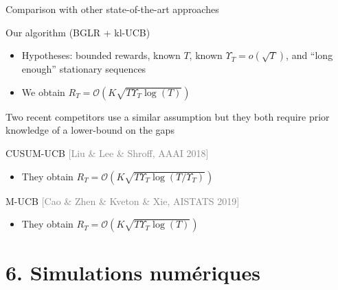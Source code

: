 \documentclass[11pt,french,ignorenonframetext,]{beamer}
\begin{document}
\begin{frame}{Comparison with other state-of-the-art approaches}

  \begin{exampleblock}{Our algorithm (BGLR + kl-UCB)}
    \begin{itemize}
      \item Hypotheses: bounded rewards, known $T$, known $\Upsilon_T = o(\sqrt{T})$, and ``long enough'' stationary sequences
      \item We obtain $R_T = \mathcal{O}(K \sqrt{T \Upsilon_T \log(T)})$
    \end{itemize}
  \end{exampleblock}

  \pause
  Two recent competitors
  use a similar assumption
  \alert{but they both require prior knowledge of a lower-bound on the gaps}


  \begin{block}{CUSUM-UCB \hfill{} \textcolor{gray}{[Liu \& Lee \& Shroff, AAAI 2018]}}
    \begin{itemize}
      \item They obtain $R_T = \mathcal{O}(K \sqrt{T \Upsilon_T \log(T / \Upsilon_T)})$
    \end{itemize}
  \end{block}

  \begin{block}{M-UCB \hfill{} \textcolor{gray}{[Cao \& Zhen \& Kveton \& Xie, AISTATS 2019]}}
    \begin{itemize}
      \item They obtain $R_T = \mathcal{O}(K \sqrt{T \Upsilon_T \log(T)})$
    \end{itemize}
  \end{block}

\end{frame}


\section{\hfill{}6. Simulations numériques\hfill{}}
\end{document}
